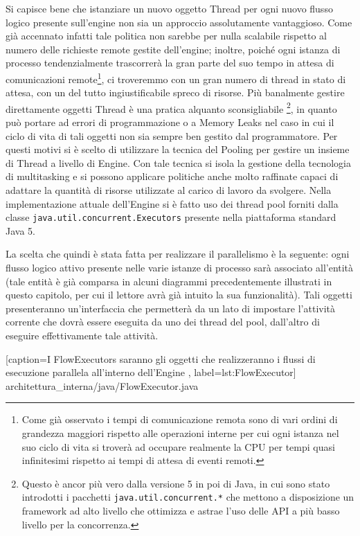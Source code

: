 Si capisce bene che istanziare un nuovo oggetto Thread per ogni nuovo
flusso logico presente sull'engine non sia un approccio assolutamente
vantaggioso. Come già accennato infatti tale politica non sarebbe per nulla
scalabile rispetto al numero delle richieste remote gestite dell'engine; inoltre,
poiché ogni istanza di processo tendenzialmente trascorrerà la gran parte del suo
tempo in attesa di comunicazioni remote\footnote{Come già osservato i tempi di
comunicazione remota sono di vari ordini di grandezza maggiori rispetto
alle operazioni interne per cui ogni istanza nel suo ciclo di vita si troverà ad
occupare realmente la CPU per tempi quasi infinitesimi rispetto ai tempi di
attesa di eventi remoti.}, ci troveremmo con un gran numero di thread in stato
di attesa, con un del tutto ingiustificabile spreco di risorse. Più banalmente
gestire direttamente oggetti Thread \`e una pratica alquanto sconsigliabile
\footnote{Questo \`e ancor pi\`u vero dalla versione 5 in poi di Java, in cui
sono stato introdotti i pacchetti \texttt{java.util.concurrent.*} che mettono a
disposizione un framework ad alto livello che ottimizza e astrae l'uso delle API
a più basso livello per la concorrenza.}, in quanto può portare ad errori di
programmazione o a Memory Leaks nel caso in cui il ciclo di vita di tali oggetti
non sia sempre ben gestito dal programmatore. Per questi motivi si \`e
scelto di utilizzare la tecnica del Pooling per gestire un insieme di Thread a
livello di Engine. Con tale tecnica si isola la gestione della tecnologia di
multitasking e si possono applicare politiche anche molto raffinate capaci di
adattare la quantità di risorse utilizzate al carico di lavoro da svolgere. Nella
implementazione attuale dell'Engine si \`e fatto uso dei thread pool forniti
dalla classe \texttt{java.util.concurrent.Executors} presente nella piattaforma
standard Java 5.
 
La scelta che quindi \`e stata fatta per realizzare il 
parallelismo \`e la seguente: ogni flusso logico attivo presente nelle varie istanze di
processo sarà associato all'entità  (tale entità \`e già
comparsa in alcuni diagrammi precedentemente illustrati in questo capitolo, per
cui il lettore avrà già intuito la sua funzionalità). Tali oggetti
presenteranno un'interfaccia che permetterà da un lato di impostare l'attività corrente che
dovrà essere eseguita da uno dei thread del pool, dall'altro di eseguire
effettivamente tale attività.


[caption={I FlowExecutors saranno gli oggetti che realizzeranno i flussi di
esecuzione parallela all'interno dell'Engine }, label=lst:FlowExecutor]
{architettura_interna/java/FlowExecutor.java}


